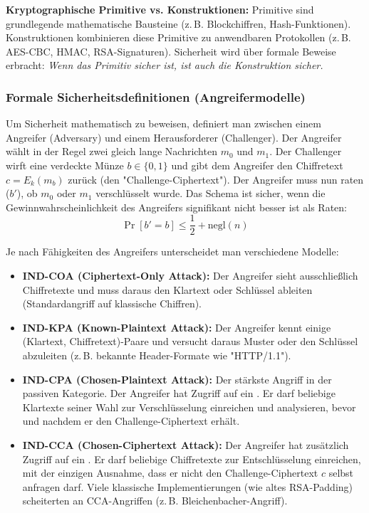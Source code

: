 \documentclass[
../../css_summary.tex,
]
{subfiles}
\begin{document}
\textbf{Kryptographische Primitive vs. Konstruktionen:}
Primitive sind grundlegende mathematische Bausteine (z.\,B. Blockchiffren, Hash-Funktionen). Konstruktionen kombinieren diese Primitive zu anwendbaren Protokollen (z.\,B. AES-CBC, HMAC, RSA-Signaturen). Sicherheit wird über formale Beweise erbracht: \textit{Wenn das Primitiv sicher ist, ist auch die Konstruktion sicher.}

\subsubsection{Formale Sicherheitsdefinitionen (Angreifermodelle)}
Um Sicherheit mathematisch zu beweisen, definiert man  zwischen einem Angreifer (Adversary) und einem Herausforderer (Challenger). Der Angreifer wählt in der Regel zwei gleich lange Nachrichten $m_0$ und $m_1$. Der Challenger wirft eine verdeckte Münze $b \in \{0,1\}$ und gibt dem Angreifer den Chiffretext $c = E_k(m_b)$ zurück (den "Challenge-Ciphertext"). Der Angreifer muss nun raten ($b'$), ob $m_0$ oder $m_1$ verschlüsselt wurde.
Das Schema ist sicher, wenn die Gewinnwahrscheinlichkeit des Angreifers signifikant nicht besser ist als Raten:
\[ \Pr[b' = b] \le \frac{1}{2} + \text{negl}(n) \]


Je nach Fähigkeiten des Angreifers unterscheidet man verschiedene Modelle:
\begin{itemize}
   \item \textbf{IND-COA (Ciphertext-Only Attack):} Der Angreifer sieht ausschließlich Chiffretexte und muss daraus den Klartext oder Schlüssel ableiten (Standardangriff auf klassische Chiffren).
   \item \textbf{IND-KPA (Known-Plaintext Attack):} Der Angreifer kennt einige (Klartext, Chiffretext)-Paare und versucht daraus Muster oder den Schlüssel abzuleiten (z.\,B. bekannte Header-Formate wie "HTTP/1.1").
   \item \textbf{IND-CPA (Chosen-Plaintext Attack):} Der stärkste Angriff in der passiven Kategorie. Der Angreifer hat Zugriff auf ein . Er darf beliebige Klartexte seiner Wahl zur Verschlüsselung einreichen und analysieren, bevor und nachdem er den Challenge-Ciphertext erhält.
   \item \textbf{IND-CCA (Chosen-Ciphertext Attack):} Der Angreifer hat zusätzlich Zugriff auf ein . Er darf beliebige Chiffretexte zur Entschlüsselung einreichen, mit der einzigen Ausnahme, dass er nicht den Challenge-Ciphertext $c$ selbst anfragen darf. Viele klassische Implementierungen (wie altes RSA-Padding) scheiterten an CCA-Angriffen (z.\,B. Bleichenbacher-Angriff).
\end{itemize}
\end{document}

